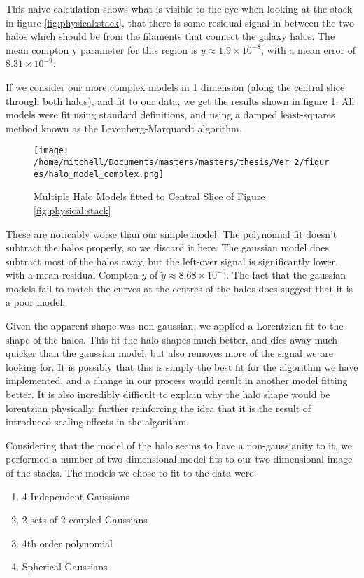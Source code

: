 This naive calculation shows what is visible to the eye when looking at the stack in figure \ref{fig:physical:stack}, that there is some residual signal in between the two halos which should be from the filaments that connect the galaxy halos. The mean compton y parameter for this region is $\bar{y} \approx 1.9 \times 10^{-8}$, with a mean error of $8.31 \times 10^{-9}$. 



\par If we consider our more complex models in 1 dimension (along the central slice through both halos), and fit to our data, we get the results shown in figure \ref{fig:halo:complex_model}. All models were fit using standard definitions, and using a damped least-squares method known as the Levenberg-Marquardt algorithm.

\begin{figure}[H]
\centering
\texttt{[image: /home/mitchell/Documents/masters/masters/thesis/Ver\_2/figures/halo\_model\_complex.png]}
\caption{ Multiple Halo Models fitted to Central Slice of Figure \ref{fig:physical:stack} }
\label{fig:halo:complex_model}
\end{figure}

These are noticably worse than our simple model. The polynomial fit doesn't subtract the halos properly, so we discard it here. The gaussian model does subtract most of the halos away, but the left-over signal is significantly lower, with a mean residual Compton $y$ of $\tilde{y} \approx 8.68 \times 10^{-9}$. The fact that the gaussian models fail to match the curves at the centres of the halos does suggest that it is a poor model.

\par Given the apparent shape was non-gaussian, we applied a Lorentzian fit to the shape of the halos. This fit the halo shapes much better, and dies away much quicker than the gaussian model, but also removes more of the signal we are looking for. It is possibly that this is simply the best fit for the algorithm we have implemented, and a change in our process would result in another model fitting better. It is also incredibly difficult to explain why the halo shape would be lorentzian physically, further reinforcing the idea that it is the result of introduced scaling effects in the algorithm. 

\par Considering that the model of the halo seems to have a non-gaussianity to it, we performed a number of two dimensional model fits to our two dimensional image of the stacks. The models we chose to fit to the data were 
\begin{enumerate}[label=(\Roman*)]
\item 4 Independent Gaussians \label{2D:model:1}
\item 2 sets of 2 coupled Gaussians \label{2D:model:2}
\item 4th order polynomial \label{2D:model:3}
\item Spherical Gaussians \label{2D:model:4}
\end{enumerate}

